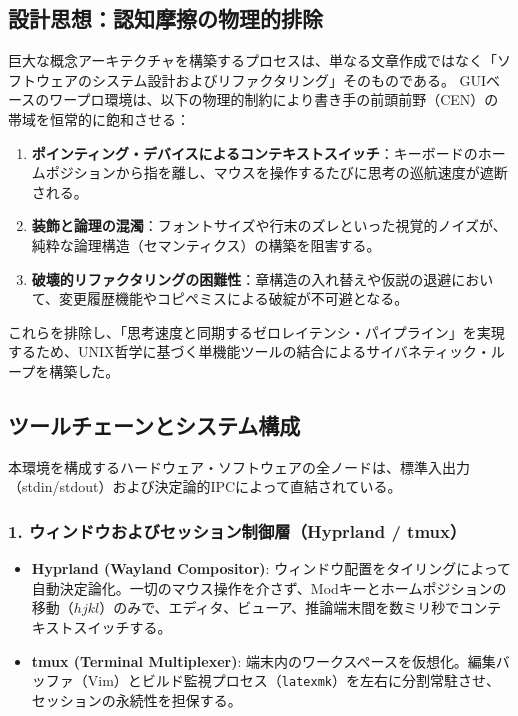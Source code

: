 \subsection{設計思想：認知摩擦の物理的排除}
巨大な概念アーキテクチャを構築するプロセスは、単なる文章作成ではなく「ソフトウェアのシステム設計およびリファクタリング」そのものである。
GUIベースのワープロ環境は、以下の物理的制約により書き手の前頭前野（CEN）の帯域を恒常的に飽和させる：
\begin{enumerate}
    \item \textbf{ポインティング・デバイスによるコンテキストスイッチ}：キーボードのホームポジションから指を離し、マウスを操作するたびに思考の巡航速度が遮断される。
    \item \textbf{装飾と論理の混濁}：フォントサイズや行末のズレといった視覚的ノイズが、純粋な論理構造（セマンティクス）の構築を阻害する。
    \item \textbf{破壊的リファクタリングの困難性}：章構造の入れ替えや仮説の退避において、変更履歴機能やコピペミスによる破綻が不可避となる。
\end{enumerate}

これらを排除し、「思考速度と同期するゼロレイテンシ・パイプライン」を実現するため、UNIX哲学に基づく単機能ツールの結合によるサイバネティック・ループを構築した。

\subsection{ツールチェーンとシステム構成}
本環境を構成するハードウェア・ソフトウェアの全ノードは、標準入出力（stdin/stdout）および決定論的IPCによって直結されている。

\subsubsection{1. ウィンドウおよびセッション制御層（Hyprland / tmux）}
\begin{itemize}
    \item \textbf{Hyprland (Wayland Compositor)}:
    ウィンドウ配置をタイリングによって自動決定論化。一切のマウス操作を介さず、Modキーとホームポジションの移動（$hjkl$）のみで、エディタ、ビューア、推論端末間を数ミリ秒でコンテキストスイッチする。
    \item \textbf{tmux (Terminal Multiplexer)}:
    端末内のワークスペースを仮想化。編集バッファ（Vim）とビルド監視プロセス（\texttt{latexmk}）を左右に分割常駐させ、セッションの永続性を担保する。
\end{itemize}

